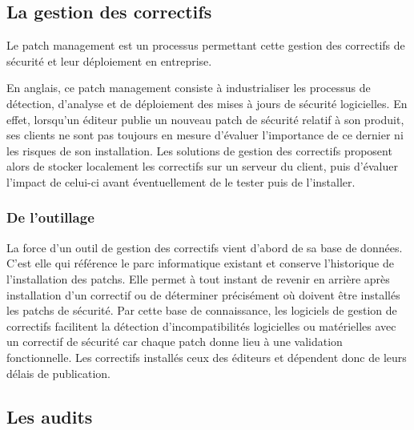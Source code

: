 \subsection{La gestion des correctifs}

Le patch management est un processus permettant cette gestion des correctifs de sécurité et leur déploiement en entreprise.


En anglais, ce patch management consiste à industrialiser les processus de détection, d'analyse et de déploiement des mises à jours de sécurité logicielles. En effet, lorsqu'un éditeur publie un nouveau patch de sécurité relatif à son produit, ses clients ne sont pas toujours en mesure d'évaluer l'importance de ce dernier ni les risques de son installation. Les solutions de gestion des correctifs proposent alors de stocker localement les correctifs sur un serveur du client, puis d'évaluer l'impact de celui-ci avant éventuellement de le tester puis de l'installer.

\subsubsection{De l'outillage}


La force d'un outil de gestion des correctifs vient d'abord de sa base de données. C'est elle qui référence le parc informatique existant et conserve l'historique de l'installation des patchs. Elle permet à tout instant de revenir en arrière après installation d'un correctif ou de déterminer précisément où doivent être installés les patchs de sécurité.
Par cette base de connaissance, les logiciels de gestion de correctifs facilitent la détection d'incompatibilités logicielles ou matérielles avec un correctif de sécurité car chaque patch donne lieu à une validation fonctionnelle. Les correctifs installés ceux des éditeurs et dépendent donc de leurs délais de publication.

\subsection{Les audits}

